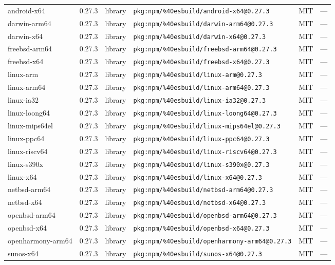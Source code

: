 \documentclass[11pt]{article}
\begin{document}
\begin{longtable}{|l|l|l|p{2.2cm}|l|p{4cm}|}
android-x64 & 0.27.3 & library & \texttt{pkg:npm/\%40esbuild/android-x64@0.27.3} & MIT & — \\
darwin-arm64 & 0.27.3 & library & \texttt{pkg:npm/\%40esbuild/darwin-arm64@0.27.3} & MIT & — \\
darwin-x64 & 0.27.3 & library & \texttt{pkg:npm/\%40esbuild/darwin-x64@0.27.3} & MIT & — \\
freebsd-arm64 & 0.27.3 & library & \texttt{pkg:npm/\%40esbuild/freebsd-arm64@0.27.3} & MIT & — \\
freebsd-x64 & 0.27.3 & library & \texttt{pkg:npm/\%40esbuild/freebsd-x64@0.27.3} & MIT & — \\
linux-arm & 0.27.3 & library & \texttt{pkg:npm/\%40esbuild/linux-arm@0.27.3} & MIT & — \\
linux-arm64 & 0.27.3 & library & \texttt{pkg:npm/\%40esbuild/linux-arm64@0.27.3} & MIT & — \\
linux-ia32 & 0.27.3 & library & \texttt{pkg:npm/\%40esbuild/linux-ia32@0.27.3} & MIT & — \\
linux-loong64 & 0.27.3 & library & \texttt{pkg:npm/\%40esbuild/linux-loong64@0.27.3} & MIT & — \\
linux-mips64el & 0.27.3 & library & \texttt{pkg:npm/\%40esbuild/linux-mips64el@0.27.3} & MIT & — \\
linux-ppc64 & 0.27.3 & library & \texttt{pkg:npm/\%40esbuild/linux-ppc64@0.27.3} & MIT & — \\
linux-riscv64 & 0.27.3 & library & \texttt{pkg:npm/\%40esbuild/linux-riscv64@0.27.3} & MIT & — \\
linux-s390x & 0.27.3 & library & \texttt{pkg:npm/\%40esbuild/linux-s390x@0.27.3} & MIT & — \\
linux-x64 & 0.27.3 & library & \texttt{pkg:npm/\%40esbuild/linux-x64@0.27.3} & MIT & — \\
netbsd-arm64 & 0.27.3 & library & \texttt{pkg:npm/\%40esbuild/netbsd-arm64@0.27.3} & MIT & — \\
netbsd-x64 & 0.27.3 & library & \texttt{pkg:npm/\%40esbuild/netbsd-x64@0.27.3} & MIT & — \\
openbsd-arm64 & 0.27.3 & library & \texttt{pkg:npm/\%40esbuild/openbsd-arm64@0.27.3} & MIT & — \\
openbsd-x64 & 0.27.3 & library & \texttt{pkg:npm/\%40esbuild/openbsd-x64@0.27.3} & MIT & — \\
openharmony-arm64 & 0.27.3 & library & \texttt{pkg:npm/\%40esbuild/openharmony-arm64@0.27.3} & MIT & — \\
sunos-x64 & 0.27.3 & library & \texttt{pkg:npm/\%40esbuild/sunos-x64@0.27.3} & MIT & — \\

\end{longtable}
\end{document}
